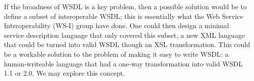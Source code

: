 If the broadness of WSDL is a key problem, then a possible solution would be to
define a subset of interoperable WSDL; this is essentially what the Web Service
Interoperability (WS-I) group have done. One could then design a minimal service
description language that only covered this subset, a new XML language that
could be turned into valid WSDL though an XSL transformation. This could be a
workable solution to the problem of making it easy to write WSDL: a
human-writeable language that had a one-way transformation into valid WSDL 1.1
or 2.0. We may explore this concept.




